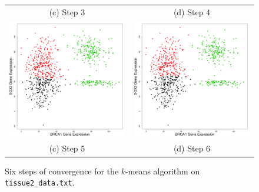 \documentclass[11pt]{article}
\begin{document}
\begin{figure}
\begin{tabular}{c c}
    (c) Step 3 & (d) Step 4 \\
    \includegraphics[width=65mm]{../tissue2_plots/cluster_step5.png} & 
    \includegraphics[width=65mm]{../tissue2_plots/cluster_step6.png} \\
    (c) Step 5 & (d) Step 6 \\
\end{tabular}
\caption{Six steps of convergence for the $k$-means algorithm
 on {\tt tissue2\_data.txt}.}
\end{figure}
\end{document}
